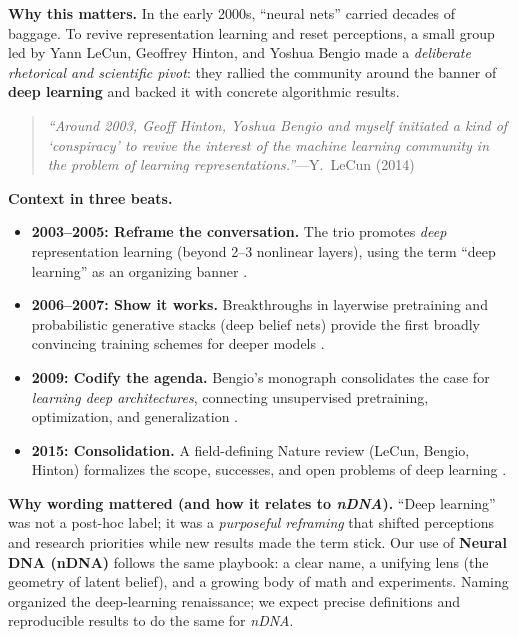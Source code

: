\documentclass[11pt]{article}
\begin{document}
\noindent \textbf{Why this matters.}
In the early 2000s, ``neural nets'' carried decades of baggage. To revive representation learning and reset perceptions, a small group led by Yann LeCun, Geoffrey Hinton, and Yoshua Bengio made a \emph{deliberate rhetorical and scientific pivot}: they rallied the community around the banner of \textbf{deep learning} and backed it with concrete algorithmic results.

\begin{quote}
\emph{``Around 2003, Geoff Hinton, Yoshua Bengio and myself initiated a kind of `conspiracy' to revive the interest of the machine learning community in the problem of learning representations.''}---Y.~LeCun (2014) \cite{LeCunKDnuggets2014}
\end{quote}

\noindent \textbf{Context in three beats.}
\begin{itemize}
  \item \textbf{2003--2005: Reframe the conversation.} The trio promotes \emph{deep} representation learning (beyond 2–3 nonlinear layers), using the term ``deep learning'' as an organizing banner \cite{LeCunKDnuggets2014}.
  \item \textbf{2006--2007: Show it works.} Breakthroughs in layerwise pretraining and probabilistic generative stacks (deep belief nets) provide the first broadly convincing training schemes for deeper models \cite{Hinton2006DBN,HintonSalakhutdinov2006Science}.
  \item \textbf{2009: Codify the agenda.} Bengio’s monograph consolidates the case for \emph{learning deep architectures}, connecting unsupervised pretraining, optimization, and generalization \cite{Bengio2009LDA}.
  \item \textbf{2015: Consolidation.} A field-defining Nature review (LeCun, Bengio, Hinton) formalizes the scope, successes, and open problems of deep learning \cite{LeCun2015Nature}.
\end{itemize}

\noindent \textbf{Why wording mattered (and how it relates to \textit{nDNA}).}
``Deep learning'' was not a post-hoc label; it was a \emph{purposeful reframing} that shifted perceptions and research priorities while new results made the term stick. Our use of \textbf{Neural DNA (nDNA)} follows the same playbook: a clear name, a unifying lens (the geometry of latent belief), and a growing body of math and experiments. Naming organized the deep-learning renaissance; we expect precise definitions and reproducible results to do the same for \emph{nDNA}.
\end{document}
